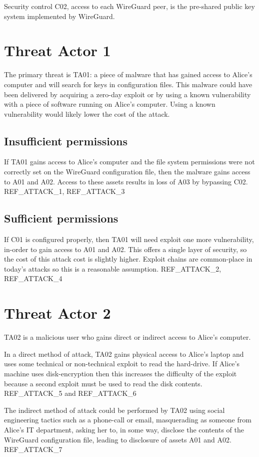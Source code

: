 \documentclass [11pt, proquest] {uwthesis}[2020/02/24]
\begin{document}
Security control C02, access to each WireGuard peer, is the pre-shared public key system implemented by WireGuard.

\section{Threat Actor 1}
The primary threat is TA01: a piece of malware that has gained access to Alice's computer and will search for keys in configuration files. This malware could have been delivered by acquiring a zero-day exploit or by using a known vulnerability with a piece of software running on Alice's computer. Using a known vulnerability would likely lower the cost of the attack.

\subsection{Insufficient permissions}
If TA01 gains access to Alice's computer and the file system permissions were not correctly set on the WireGuard configuration file, then the malware gains access to A01 and A02. Access to these assets results in loss of A03 by bypassing C02. 
REF_ATTACK_1, REF_ATTACK_3

\subsection{Sufficient permissions}
If C01 is configured properly, then TA01 will need exploit one more vulnerability, in-order to gain access to A01 and A02. This offers a single layer of security, so the cost of this attack cost is slightly higher. Exploit chains are common-place in today's attacks so this is a reasonable assumption.  
REF_ATTACK_2, REF_ATTACK_4

\section{Threat Actor 2}
TA02 is a malicious user who gains direct or indirect access to Alice's computer.  

In a direct method of attack, TA02 gains physical access to Alice's laptop and uses some technical or non-technical exploit to read the hard-drive. If Alice's machine uses disk-encryption then this increases the difficulty of the exploit because a second exploit must be used to read the disk contents.
REF_ATTACK_5 and REF_ATTACK_6

The indirect method of attack could be performed by TA02 using social engineering tactics such as a phone-call or email, masquerading as someone from Alice's IT department, asking her to, in some way, disclose the contents of the WireGuard configuration file, leading to disclosure of assets A01 and A02.
REF_ATTACK_7
\end{document}
